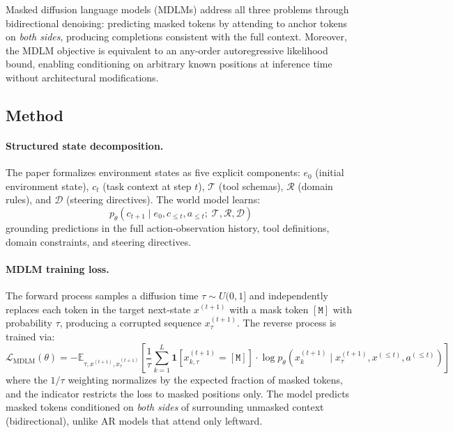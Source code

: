 \documentclass[11pt,a4paper]{article}
\begin{document}
Masked diffusion language models (MDLMs) address all three problems through bidirectional denoising: predicting masked tokens by attending to anchor tokens on \emph{both sides}, producing completions consistent with the full context. Moreover, the MDLM objective is equivalent to an any-order autoregressive likelihood bound, enabling conditioning on arbitrary known positions at inference time without architectural modifications.

\subsection{Method}

\paragraph{Structured state decomposition.}
The paper formalizes environment states as five explicit components: $e_0$ (initial environment state), $c_t$ (task context at step $t$), $\mathcal{T}$ (tool schemas), $\mathcal{R}$ (domain rules), and $\mathcal{D}$ (steering directives). The world model learns:
\begin{equation}
    p_\theta(c_{t+1} \mid e_0, c_{\leq t}, a_{\leq t};\; \mathcal{T}, \mathcal{R}, \mathcal{D})
\end{equation}
grounding predictions in the full action-observation history, tool definitions, domain constraints, and steering directives.

\paragraph{MDLM training loss.}
The forward process samples a diffusion time $\tau \sim U(0, 1]$ and independently replaces each token in the target next-state $x^{(t+1)}$ with a mask token $[\texttt{M}]$ with probability $\tau$, producing a corrupted sequence $x_\tau^{(t+1)}$. The reverse process is trained via:
\begin{equation}
    \mathcal{L}_{\text{MDLM}}(\theta) = -\mathbb{E}_{\tau, x^{(t+1)}, x_\tau^{(t+1)}} \left[ \frac{1}{\tau} \sum_{k=1}^{L} \mathbf{1}[x_{k,\tau}^{(t+1)} = [\texttt{M}]] \cdot \log p_\theta\!\left(x_k^{(t+1)} \mid x_\tau^{(t+1)}, x^{(\leq t)}, a^{(\leq t)}\right) \right]
\end{equation}
where the $1/\tau$ weighting normalizes by the expected fraction of masked tokens, and the indicator restricts the loss to masked positions only. The model predicts masked tokens conditioned on \emph{both sides} of surrounding unmasked context (bidirectional), unlike AR models that attend only leftward.
\end{document}
